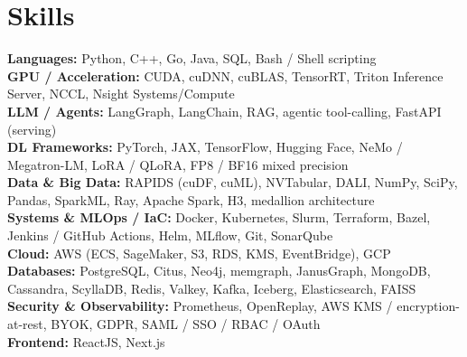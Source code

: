 \documentclass[letterpaper,10pt]{article}
\begin{document}
\section{Skills}
{\small
\noindent \textbf{Languages:} Python, C++, Go, Java, SQL, Bash / Shell scripting \\
\textbf{GPU / Acceleration:} CUDA, cuDNN, cuBLAS, TensorRT, Triton Inference Server, NCCL, Nsight Systems/Compute \\
\textbf{LLM / Agents:} LangGraph, LangChain, RAG, agentic tool-calling, FastAPI (serving) \\
\textbf{DL Frameworks:} PyTorch, JAX, TensorFlow, Hugging Face, NeMo / Megatron-LM, LoRA / QLoRA, FP8 / BF16 mixed precision \\
\textbf{Data \& Big Data:} RAPIDS (cuDF, cuML), NVTabular, DALI, NumPy, SciPy, Pandas, SparkML, Ray, Apache Spark, H3, medallion architecture \\
\textbf{Systems \& MLOps / IaC:} Docker, Kubernetes, Slurm, Terraform, Bazel, Jenkins / GitHub Actions, Helm, MLflow, Git, SonarQube \\
\textbf{Cloud:} AWS (ECS, SageMaker, S3, RDS, KMS, EventBridge), GCP \\
\textbf{Databases:} PostgreSQL, Citus, Neo4j, memgraph, JanusGraph, MongoDB, Cassandra, ScyllaDB, Redis, Valkey, Kafka, Iceberg, Elasticsearch, FAISS \\
\textbf{Security \& Observability:} Prometheus, OpenReplay, AWS KMS / encryption-at-rest, BYOK, GDPR, SAML / SSO / RBAC / OAuth \\
\textbf{Frontend:} ReactJS, Next.js
\par}

\end{document}
